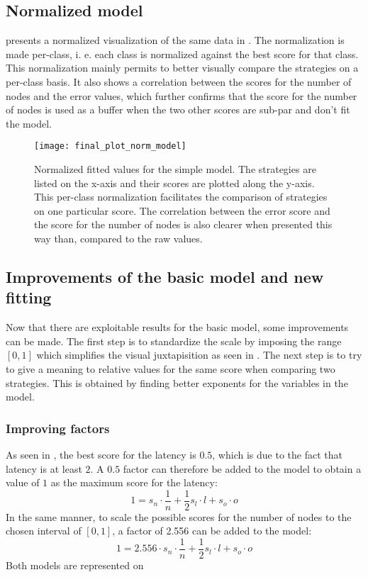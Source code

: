 \FloatBarrier
\subsection{Normalized model}
 presents a normalized visualization of the same
data in . The normalization is made per-class, i. e.
each class is normalized against the best score for that class. This
normalization mainly permits to better visually compare the strategies on a
per-class basis. It also shows a correlation between the scores for the number
of nodes and the error values, which further confirms that the score for the
number of nodes is used as a buffer when the two other scores are sub-par and
don't fit the model.


\begin{figure}[h]
    \centering
    \texttt{[image: final\_plot\_norm\_model]}
    \caption{Normalized fitted values for the simple model. The strategies are listed
    on the x-axis and their scores are plotted along the y-axis. 
    This per-class normalization facilitates the comparison of strategies on one
    particular score.
    The correlation between the error score and the score for the number of
    nodes is also clearer when presented this way than, compared to the raw
    values.
    }
    \label{fig:recapTestsPlotNorm}
\end{figure}

\FloatBarrier
\subsection{Improvements of the basic model and new fitting}
\label{ssec:fittingImproved}
Now that there are exploitable results for the basic model, some improvements
can be made. The first step is to standardize the scale by imposing the range
\([0,1]\) which simplifies the visual juxtapisition as seen in
. The next step is to try to give a meaning to
relative values for the same score when comparing two strategies. This is
obtained by finding better exponents for the variables in the model.

\subsubsection{Improving factors}
As seen in , the best score for
the latency is \(0.5\), which is due to the fact that latency is at least \(2\).
A \(0.5\) factor can therefore be added to the model to obtain a value of \(1\)
as the maximum score for the latency:
\[1 = s_n \cdot \frac{1}{n} + \frac{1}{2} s_l\cdot l + s_o\cdot o\]
In the same manner, to scale the possible scores for the number of nodes to the
chosen interval of \([0,1]\), a factor of 2.556 can be added to the model:
\[1 = 2.556\cdot s_n \cdot \frac{1}{n} + \frac{1}{2} s_l\cdot l + s_o\cdot o\]
Both models are represented on 

